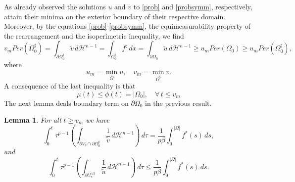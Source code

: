 \documentclass[12pt]{article}
\newcommand{\abs}[1]{{\left|#1\right|}}
\newcommand{\dH}{d\mathcal{H}^{n-1}}
\theoremstyle{definition}
\theoremstyle{plain}
\newtheorem{lemma}[teorema]{Lemma}
\theoremstyle{definition}
\begin{document}
As already observed the solutions $u$ and $v$ to \eqref{prob} and \eqref{probsymm}, respectively, attain their minima on the exterior boundary of their respective domain. Moreover, by the equations \eqref{prob}-\eqref{probsymm}, the equimeasurability property of the rearrangement and the isoperimetric inequality, we find
\begin{equation*}
      v_mPer(\Omega_0^\sharp)=\int_{\partial \Omega_0^\sharp}\tilde v\,\dH=\int_{\Omega_0^\sharp} f^\sharp\,dx=\int_{\partial\Omega_0}\tilde u\,\dH\geq u_mPer(\Omega_0)\geq u_mPer(\Omega_0^\sharp),
\end{equation*}
where
\begin{equation*}
u_m=\min_{\overline\Omega} u,\quad v_m=\min_{\overline\Omega^\sharp} v.
\end{equation*}
A consequence of the last inequality is that
\begin{equation*}
    \mu(t)\leq\phi(t)=\abs{\Omega_0},\quad \forall\, t\leq v_m
\end{equation*}
The next lemma deals boundary term on $\partial\Omega_0$ in the previous result.
\begin{lemma}\label{lemma3.5}
    For all $t\geq v_m$ we have
    \begin{equation*}
       \int_0^t\tau^{p-1}\left(\int_{\partial V_\tau\cap\partial\Omega_0^\sharp}\frac{1}{\tilde v}\,\dH\right)\,d\tau=\frac{1}{p\beta}\int_0^{\abs{\Omega}}f^*(s)\,ds,
    \end{equation*}
    and
    \begin{equation*}
      \int_0^t\tau^{p-1}\left(\int_{\partial U_\tau^{ext}}\frac{1}{\tilde u}\,\dH\right)\,d\tau\leq\frac{1}{p\beta}\int_0^{\abs{\Omega}}f^*(s)\,ds.
    \end{equation*}
\end{lemma} 
\end{document}
